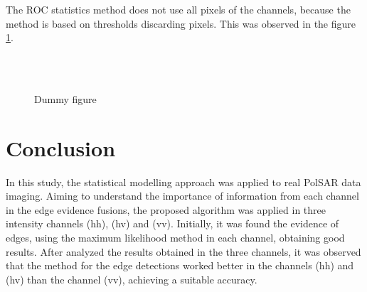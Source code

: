 \documentclass[conference]{IEEEtran}
\begin{document}
{{{{The ROC statistics method does not use all pixels of the channels, because the method is based on thresholds discarding pixels. This was observed in the figure \ref{fig_03}.

\begin{figure}[!ht]
     \hfill
     \\
     \hfill
     \\
     \caption{Dummy figure}
     \label{fig_03}
   \end{figure}

\section{Conclusion}\label{sec_08}
In this study, the statistical modelling approach was applied to real PolSAR data imaging. Aiming to understand the importance of information from each channel in the edge evidence fusions, the proposed algorithm was applied in three intensity channels (hh), (hv) and (vv). Initially, it was found the evidence of edges, using the maximum likelihood  method in each channel, obtaining good results. After analyzed the results obtained in the three channels, it was observed that the method for the edge detections worked better in the channels (hh) and (hv) than the channel (vv), achieving a suitable accuracy.

}}}}
\end{document}
